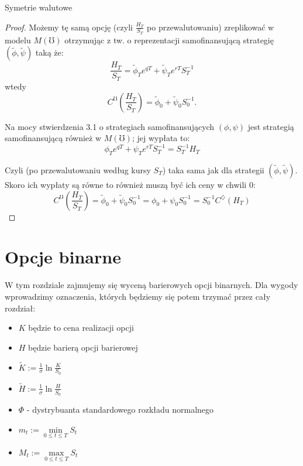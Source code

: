 \documentclass[11pt]{report}
\begin{document}
\begin{chapter}{Symetrie walutowe}
\begin{proof}
Możemy tę samą opcję (czyli $\frac{H_T}{S_T}$ po przewalutowaniu) zreplikować w modelu $M(\mho)$ otrzymując z tw. o reprezentacji samofinansującą strategię $(\tilde{\phi}, \tilde{\psi})$ taką że:
\begin{equation*}
\frac{H_T}{S_T} = \tilde{\phi}_T e^{qT} + \tilde{\psi}_T e^{rT}S^{-1}_T  
\end{equation*}
wtedy
\begin{equation*}
C^{\mho} \left( \frac{H_T}{S_T} \right) = \tilde{\phi}_0 + \tilde{\psi}_0 S^{-1}_0.
\end{equation*}


Na mocy stwierdzenia 3.1 o strategiach samofinansujących $(\phi, \psi)$ jest strategią samofinansującą również w $M(\mho)$; jej wypłata to:
\begin{equation*}
\phi_T e^{qT} + \psi_T e^{rT} S^{-1}_T = S^{-1}_T H_T
\end{equation*}

Czyli (po przewalutowaniu według kursy $S_T$) taka sama jak dla strategii $(\tilde{\phi}, \tilde{\psi})$. Skoro ich wypłaty są równe to również muszą być ich ceny w chwili $0$:
\begin{equation*}
C^{\mho}\left( \frac{H_T}{S_T} \right) = \tilde{\phi}_0 + \tilde{\psi}_0S^{-1}_0 = \phi_0 + \psi_0 S^{-1}_0 = S^{-1}_0 C^{\diamondsuit}(H_T) 
\end{equation*}
\end{proof}

\end{chapter}



\chapter{Opcje binarne}
W tym rozdziale zajmujemy się wyceną barierowych opcji binarnych.    
Dla wygody wprowadzimy oznaczenia, których będziemy się potem trzymać przez cały rozdział:
\begin{itemize}
\item $K$ będzie to cena realizacji opcji
\item $H$ będzie barierą opcji barierowej
\item $\tilde{K} := \frac{1}{\sigma}\ln\frac{K}{S_0} $
\item $\tilde{H} := \frac{1}{\sigma}\ln\frac{H}{S_0} $
\item $\Phi $ - dystrybuanta standardowego rozkładu normalnego
\item $m_t := \min\limits_{0 \le t \le T} S_t $
\item $M_t := \max\limits_{0 \le t \le T} S_t$
\end{itemize}
\end{document}

